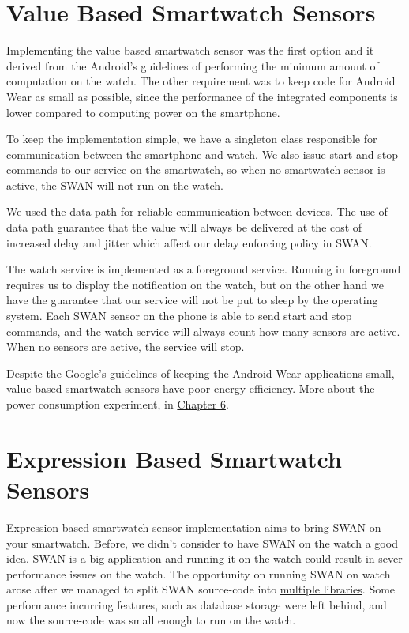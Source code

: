 \section{ Value Based Smartwatch Sensors }
Implementing the value based smartwatch sensor was the first option and it derived from the Android's guidelines of performing the minimum amount of computation on the watch.
The other requirement was to keep code for Android Wear as small as possible, since the performance of the integrated components is lower compared to computing power on the smartphone.

To keep the implementation simple, we have a singleton class  responsible for communication between the smartphone and watch. We also issue start and stop commands to our service on the smartwatch,
so when no smartwatch sensor is active, the SWAN will not run on the watch.

We used the data path \cite{android_wear_datapath} for reliable communication between devices. The use of data path guarantee that the value will always be delivered at the cost of increased delay
and jitter\cite{jitter_ref} which affect our delay enforcing policy in SWAN.

The watch service is implemented as a foreground service\cite{foreground_service}. Running in foreground requires us to display the notification on the watch, but on the other hand we have the 
guarantee that our service will not be put to sleep by the operating system. 
Each SWAN sensor on the phone  is able to send start and stop commands, and the watch service will always count how many sensors are active. When no sensors are active, the service will stop.

Despite the Google's guidelines of keeping the Android Wear applications small, value based smartwatch sensors have poor energy efficiency. More about the power consumption experiment, 
in \hyperref[Chapter6]{Chapter 6}.

\section{Expression  Based  Smartwatch Sensors }

Expression based smartwatch sensor implementation aims to bring SWAN on your smartwatch. Before, we didn't consider to have SWAN on the watch a good idea. SWAN is a big application and running
it on the watch could result in sever performance issues on the watch. The opportunity on running SWAN on watch arose after we managed to split SWAN source-code into \hyperref[scc:swan_split]{multiple libraries}. Some performance incurring features, such as database storage were left behind, and now the source-code was small enough to run on the watch.

